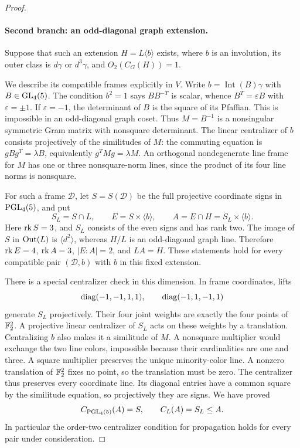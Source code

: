 \begin{proof}
\paragraph{Second branch: an odd-diagonal graph extension.}
Suppose that such an extension $H=L\langle b\rangle$ exists,
where $b$ is an involution, its outer class is $d\gamma$ or
$d^3\gamma$, and $O_2(C_G(H))=1$.

We describe its compatible frames explicitly in $V$. Write
$b=\operatorname{Int}(B)\gamma$ with $B\in\operatorname{GL}_4(5)$.
The condition $b^2=1$ says $BB^{-T}$ is scalar, whence
$B^T=\varepsilon B$ with $\varepsilon=\pm1$.
If $\varepsilon=-1$, the determinant of $B$ is the square of
its Pfaffian. This is impossible in an odd-diagonal graph coset.
Thus $M=B^{-1}$ is a nonsingular symmetric Gram matrix with
nonsquare determinant. The linear centralizer of $b$ consists
projectively of the similitudes of $M$: the commuting equation
is $gBg^T=\lambda B$, equivalently
$g^TMg=\lambda M$. An orthogonal nondegenerate line frame for
$M$ has one or three nonsquare-norm lines, since the product of
its four line norms is nonsquare.

For such a frame $\mathcal D$, let $S=S(\mathcal D)$ be the full
projective coordinate signs in $\operatorname{PGL}_4(5)$, and put
\[
 S_L=S\cap L,\qquad E=S\times\langle b\rangle,\qquad
 A=E\cap H=S_L\times\langle b\rangle.
\]
Here $\operatorname{rk} S=3$, and $S_L$ consists of the even signs and has
rank two. The image of $S$ in $\operatorname{Out}(L)$ is
$\langle d^2\rangle$, whereas $H/L$ is an odd-diagonal graph
line. Therefore $\operatorname{rk} E=4$, $\operatorname{rk} A=3$, $|E:A|=2$, and $LA=H$.
These statements hold for every compatible pair $(\mathcal D,b)$
with $b$ in this fixed extension.

There is a special centralizer check in this dimension. In frame
coordinates, lifts
\[
 \operatorname{diag}(-1,-1,1,1),\qquad \operatorname{diag}(-1,1,-1,1)
\]
generate $S_L$ projectively. Their four joint weights are exactly
the four points of $\mathbb F_2^2$. A projective linear centralizer of
$S_L$ acts on these weights by a translation. Centralizing $b$
also makes it a similitude of $M$. A nonsquare multiplier would
exchange the two line colors, impossible because their
cardinalities are one and three. A square multiplier preserves
the unique minority-color line. A nonzero translation of
$\mathbb F_2^2$ fixes no point, so the translation must be zero.
The centralizer thus preserves every coordinate line. Its
diagonal entries have a common square by the similitude equation,
so projectively they are signs. We have proved
\begin{equation}\label{eq:psl45-four-centralizer}
 C_{\operatorname{PGL}_4(5)}(A)=S,\qquad C_L(A)=S_L\leq A.
\end{equation}
In particular the order-two centralizer condition for propagation
holds for every pair under consideration.


\end{proof}

